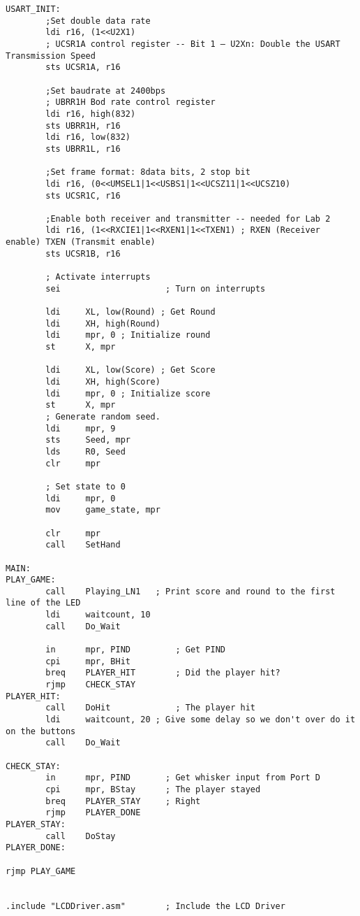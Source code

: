 \documentclass[10pt,letterpaper]{article}
\begin{document}
\begin{verbatim}
USART_INIT:
        ;Set double data rate
        ldi r16, (1<<U2X1)
        ; UCSR1A control register -- Bit 1 – U2Xn: Double the USART Transmission Speed
        sts UCSR1A, r16

        ;Set baudrate at 2400bps
        ; UBRR1H Bod rate control register
        ldi r16, high(832)
        sts UBRR1H, r16
        ldi r16, low(832)
        sts UBRR1L, r16

		;Set frame format: 8data bits, 2 stop bit
        ldi r16, (0<<UMSEL1|1<<USBS1|1<<UCSZ11|1<<UCSZ10)
        sts UCSR1C, r16

        ;Enable both receiver and transmitter -- needed for Lab 2
        ldi r16, (1<<RXCIE1|1<<RXEN1|1<<TXEN1) ; RXEN (Receiver enable) TXEN (Transmit enable)
        sts UCSR1B, r16

		; Activate interrupts
		sei						; Turn on interrupts

        ldi		XL, low(Round) ; Get Round
        ldi		XH, high(Round)
        ldi     mpr, 0 ; Initialize round
        st      X, mpr

        ldi		XL, low(Score) ; Get Score
        ldi		XH, high(Score)
        ldi     mpr, 0 ; Initialize score
        st      X, mpr
        ; Generate random seed.
        ldi     mpr, 9
        sts     Seed, mpr
        lds     R0, Seed
        clr     mpr

        ; Set state to 0
        ldi     mpr, 0
        mov     game_state, mpr

        clr     mpr
        call    SetHand

MAIN:
PLAY_GAME:
        call    Playing_LN1   ; Print score and round to the first line of the LED
        ldi     waitcount, 10
        call    Do_Wait

        in      mpr, PIND         ; Get PIND
        cpi     mpr, BHit
        breq    PLAYER_HIT        ; Did the player hit?
        rjmp    CHECK_STAY
PLAYER_HIT:
        call    DoHit             ; The player hit
        ldi     waitcount, 20 ; Give some delay so we don't over do it on the buttons
        call    Do_Wait

CHECK_STAY:
        in      mpr, PIND       ; Get whisker input from Port D
        cpi     mpr, BStay      ; The player stayed
        breq    PLAYER_STAY     ; Right
        rjmp    PLAYER_DONE
PLAYER_STAY:
        call    DoStay
PLAYER_DONE:

rjmp PLAY_GAME


.include "LCDDriver.asm"		; Include the LCD Driver


\end{verbatim}
\end{document}
